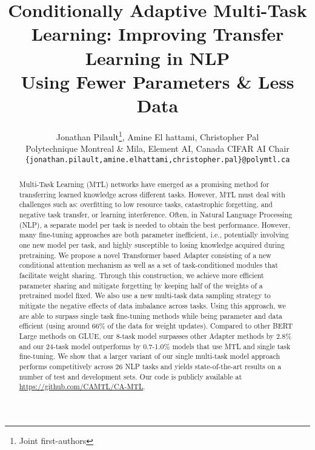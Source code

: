 \documentclass{article} \usepackage{iclr2021_conference,times}
\title{Conditionally Adaptive Multi-Task Learning: Improving Transfer Learning in NLP \\ Using Fewer Parameters \& Less Data}
\author{Jonathan Pilault\thanks{Joint first-authors}, Amine El hattami, Christopher Pal \\ 
Polytechnique Montreal \& Mila, Element AI,
Canada CIFAR AI Chair \\
\texttt{\{jonathan.pilault,amine.elhattami,christopher.pal\}@polymtl.ca}
}
\begin{document}
\maketitle

\begin{abstract}

Multi-Task Learning (MTL) networks have emerged as a promising method for transferring learned knowledge across different tasks. However, MTL must deal with challenges such as: overfitting to low resource tasks, catastrophic forgetting, and negative task transfer, or learning interference. Often, in Natural Language Processing (NLP), a separate model per task is needed to obtain the best performance. However, many fine-tuning approaches are both parameter inefficient, i.e., potentially involving one new model per task, and highly susceptible to losing knowledge acquired during pretraining. 
We propose a novel Transformer based Adapter consisting of a new conditional attention mechanism as well as a set of task-conditioned modules that facilitate weight sharing. Through this construction, we achieve more efficient parameter sharing and mitigate forgetting by keeping half of the weights of a pretrained model fixed. 
We also use a new multi-task data sampling strategy to mitigate the negative effects of data imbalance across tasks. Using this approach, we are able to surpass single task fine-tuning methods while being parameter and data efficient (using around 66\% of the data for weight updates). Compared to other BERT Large methods on GLUE, our 8-task model surpasses other Adapter methods by 2.8\% and our 24-task model outperforms by 0.7-1.0\% models that use MTL and single task fine-tuning. We show that a larger variant of our single multi-task model approach performs competitively across 26 NLP tasks and yields state-of-the-art results on a number of test and development sets. Our code is publicly available at \url{https://github.com/CAMTL/CA-MTL}.



\end{abstract}
\end{document}
